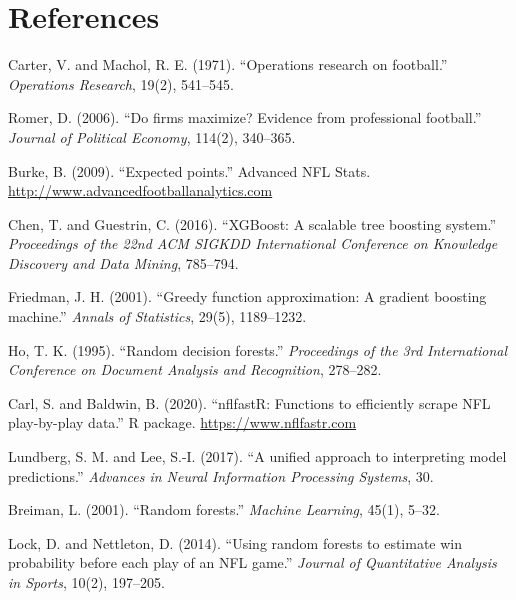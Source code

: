 \documentclass[11pt]{article}
\begin{document}
\section*{References}

\begin{enumerate}[label={[\arabic*]}, leftmargin=2.5em, itemsep=2pt]

  \item Carter, V. and Machol, R. E. (1971). ``Operations research on football.''
    \textit{Operations Research}, 19(2), 541--545.

  \item Romer, D. (2006). ``Do firms maximize? Evidence from professional football.''
    \textit{Journal of Political Economy}, 114(2), 340--365.

  \item Burke, B. (2009). ``Expected points.''
    Advanced NFL Stats. \url{http://www.advancedfootballanalytics.com}

  \item Chen, T. and Guestrin, C. (2016). ``XGBoost: A scalable tree boosting system.''
    \textit{Proceedings of the 22nd ACM SIGKDD International Conference on
    Knowledge Discovery and Data Mining}, 785--794.

  \item Friedman, J. H. (2001). ``Greedy function approximation: A gradient
    boosting machine.'' \textit{Annals of Statistics}, 29(5), 1189--1232.

  \item Ho, T. K. (1995). ``Random decision forests.''
    \textit{Proceedings of the 3rd International Conference on Document
    Analysis and Recognition}, 278--282.

  \item Carl, S. and Baldwin, B. (2020). ``nflfastR: Functions to efficiently
    scrape NFL play-by-play data.'' R package.
    \url{https://www.nflfastr.com}

  \item Lundberg, S. M. and Lee, S.-I. (2017). ``A unified approach to
    interpreting model predictions.'' \textit{Advances in Neural Information
    Processing Systems}, 30.

  \item Breiman, L. (2001). ``Random forests.''
    \textit{Machine Learning}, 45(1), 5--32.

  \item Lock, D. and Nettleton, D. (2014). ``Using random forests to estimate
    win probability before each play of an NFL game.''
    \textit{Journal of Quantitative Analysis in Sports}, 10(2), 197--205.

\end{enumerate}
\end{document}
